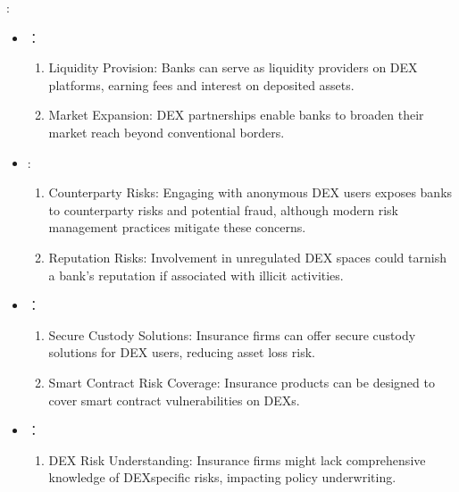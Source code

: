 \documentclass[letterpaper,10pt,english]{jupyterBook}
\begin{document}
\sphinxAtStartPar
{}:
\begin{itemize}
\item {} 
\sphinxAtStartPar
{}：
\begin{enumerate}
%
\item {} 
\sphinxAtStartPar
Liquidity Provision: Banks can serve as liquidity providers on DEX platforms, earning fees and interest on deposited assets.

\item {} 
\sphinxAtStartPar
Market Expansion: DEX partnerships enable banks to broaden their market reach beyond conventional borders.

\end{enumerate}

\item {} 
\sphinxAtStartPar
{}:
\begin{enumerate}
%
\item {} 
\sphinxAtStartPar
Counterparty Risks: Engaging with anonymous DEX users exposes banks to counterparty risks and potential fraud, although modern risk management practices mitigate these concerns.

\item {} 
\sphinxAtStartPar
Reputation Risks: Involvement in unregulated DEX spaces could tarnish a bank’s reputation if associated with illicit activities.

\end{enumerate}

\item {} 
\sphinxAtStartPar
{}：
\begin{enumerate}
%
\item {} 
\sphinxAtStartPar
Secure Custody Solutions: Insurance firms can offer secure custody solutions for DEX users, reducing asset loss risk.

\item {} 
\sphinxAtStartPar
Smart Contract Risk Coverage: Insurance products can be designed to cover smart contract vulnerabilities on DEXs.

\end{enumerate}

\item {} 
\sphinxAtStartPar
{}：
\begin{enumerate}
%
\item {} 
\sphinxAtStartPar
DEX Risk Understanding: Insurance firms might lack comprehensive knowledge of DEX\sphinxhyphen{}specific risks, impacting policy underwriting.


\end{enumerate}
\end{itemize}
\end{document}
